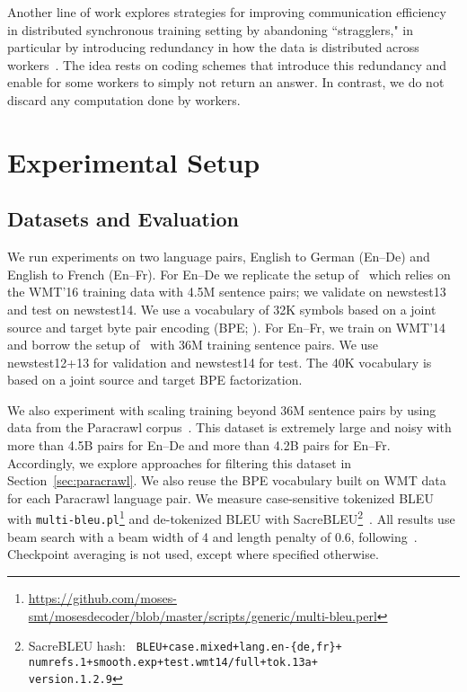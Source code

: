 \documentclass[11pt,a4paper]{article}
\begin{document}
Another line of work explores strategies for improving communication efficiency in distributed synchronous training setting by abandoning ``stragglers," in particular by introducing redundancy in how the data is distributed across workers~\citep{tandon2017icml,min2018icml}.
The idea rests on coding schemes that introduce this redundancy and enable for some workers to simply not return an answer.
In contrast, we do not discard any computation done by workers.

\section{Experimental Setup}

\subsection{Datasets and Evaluation}\label{sec:datasets}

We run experiments on two language pairs, English to German (En--De) and English to French (En--Fr). 
For En--De we replicate the setup of~\citet{vaswani2017transformer} which relies on the WMT'16 training data with 4.5M sentence pairs; we validate on newstest13 and test on newstest14.
We use a vocabulary of 32K symbols based on a joint source and target byte pair encoding (BPE; \citealt{bpe}).
For En--Fr, we train on WMT'14 and borrow the setup of~\citet{gehring2017convs2s} with 36M training sentence pairs.
We use newstest12+13 for validation and newstest14 for test.
The 40K vocabulary is based on a joint source and target BPE factorization.

We also experiment with scaling training beyond 36M sentence pairs by using data from the Paracrawl corpus~\cite{paracrawl}.
This dataset is extremely large and noisy with more than 4.5B pairs for En--De and more than 4.2B pairs for En--Fr.
Accordingly, we explore approaches for filtering this dataset in Section~\ref{sec:paracrawl}.
We also reuse the BPE vocabulary built on WMT data for each Paracrawl language pair.
We measure case-sensitive tokenized BLEU with \texttt{multi-bleu.pl}\footnote{\url{https://github.com/moses-smt/mosesdecoder/blob/master/scripts/generic/multi-bleu.perl}} and de-tokenized BLEU with SacreBLEU\footnote{SacreBLEU hash: \texttt{\scriptsize
\mbox{BLEU+case.mixed+lang.en-\{de,fr\}+}\\
\mbox{numrefs.1+smooth.exp+test.wmt14/full+tok.13a+}\\
\mbox{version.1.2.9}}}~\citep{post2018sacrebleu}.
All results use beam search with a beam width of 4 and length penalty of 0.6, following~\citealt{vaswani2017transformer}.
Checkpoint averaging is not used, except where specified otherwise.
\end{document}
